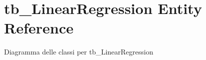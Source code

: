 \hypertarget{classtb___linear_regression}{}\section{tb\+\_\+\+Linear\+Regression Entity Reference}
\label{classtb___linear_regression}


Diagramma delle classi per tb\+\_\+\+Linear\+Regression
